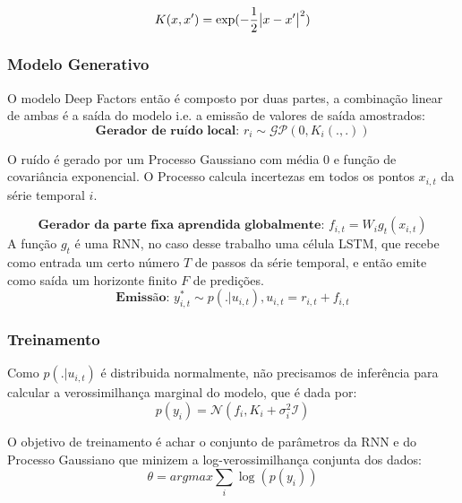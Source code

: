 \[
  K(x,x') = \exp(-\frac{1}{2}\abs{x - x'}^2)
\]


\subsubsection{Modelo Generativo}

O modelo Deep Factors então é composto por duas partes, a combinação linear de ambas é a saída do modelo i.e. a emissão de valores de saída amostrados: \\


\[
    \textbf{Gerador de ruído local: }  r_i \sim \mathcal{GP} (0, K_i(.,.))
\]

O ruído é gerado por um Processo Gaussiano com média 0 e função de covariância exponencial. O Processo calcula incertezas em todos os pontos $x_{i,t}$ da série temporal $i$.
  
\[
  \textbf{Gerador da parte fixa aprendida globalmente: }  f_{i,t} = W_ig_t(x_{i,t})
\]
A função $g_t$ é uma RNN, no caso desse trabalho uma célula LSTM, que recebe como entrada um certo número $T$ de passos da série temporal, e então emite como saída um horizonte finito $F$ de predições.
\[
  \textbf{Emissão: }  y^*_{i,t} \sim p(. | u_{i,t}) , u_{i,t} = r_{i,t} + f_{i,t}  
\]

\subsubsection{Treinamento}

Como $p(. | u_{i,t})$ é distribuida normalmente, não precisamos de inferência para calcular a verossimilhança marginal do modelo, que é dada por: \\

\[
p(y_{i}) = \mathcal{N}(f_i,K_i + \sigma_i^2\mathcal{I})
\]

O objetivo de treinamento é achar o conjunto de parâmetros da RNN e do Processo Gaussiano que minizem a log-verossimilhança conjunta dos dados: \\

\[
\theta = argmax \sum_i{\log(p(y_i))}
\]


